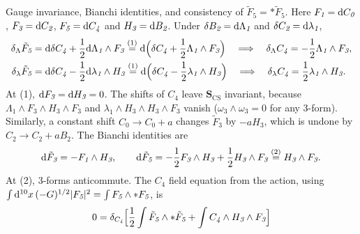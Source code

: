 \begin{tcolorbox}[breakable]
	\begin{remark}
		Gauge invariance, Bianchi identities, and consistency of $\tilde F_{\textit{5}}=\ast\tilde F_{\textit{5}}$. Here $F_{\textit{1}}=\mathrm{d} C_{\textit{0}}$, $F_{\textit{3}}=\mathrm{d} C_{\textit{2}}$, $F_{\textit{5}}=\mathrm{d} C_{\textit{4}}$ and $H_{\textit{3}}=\mathrm{d} B_{\textit{2}}$. Under $\delta B_{\textit{2}}=\mathrm{d}\Lambda_{\textit{1}}$ and $\delta C_{\textit{2}}=\mathrm{d}\lambda_{\textit{1}}$,
		\begin{align*}
			\delta_{\Lambda}\tilde F_{\textit{5}}&=\mathrm{d}\delta C_{\textit{4}}+\frac12\mathrm{d}\Lambda_{\textit{1}}\wedge F_{\textit{3}}
			\overset{(1)}{=} \mathrm{d}\Bigl(\delta C_{\textit{4}}+\frac12\Lambda_{\textit{1}}\wedge F_{\textit{3}}\Bigr)
			\quad\Longrightarrow\quad \delta_{\Lambda}C_{\textit{4}}=-\frac12\Lambda_{\textit{1}}\wedge F_{\textit{3}},\\
			\delta_{\lambda}\tilde F_{\textit{5}}&=\mathrm{d}\delta C_{\textit{4}}-\frac12\mathrm{d}\lambda_{\textit{1}}\wedge H_{\textit{3}}
			\overset{(1)}{=} \mathrm{d}\Bigl(\delta C_{\textit{4}}-\frac12\lambda_{\textit{1}}\wedge H_{\textit{3}}\Bigr)
			\quad\Longrightarrow\quad \delta_{\lambda}C_{\textit{4}}=\frac12\lambda_{\textit{1}}\wedge H_{\textit{3}} .
		\end{align*}
		At (1), $\mathrm{d} F_{\textit{3}}=\mathrm{d} H_{\textit{3}}=0$. The shifts of $C_{\textit{4}}$ leave $\bm S_{\text{CS}}$ invariant, because $\Lambda_{\textit{1}}\wedge F_{\textit{3}}\wedge H_{\textit{3}}\wedge F_{\textit{3}}$ and $\lambda_{\textit{1}}\wedge H_{\textit{3}}\wedge H_{\textit{3}}\wedge F_{\textit{3}}$ vanish ($\omega_{3}\wedge\omega_{3}=0$ for any 3-form). Similarly, a constant shift $C_{\textit{0}}\to C_{\textit{0}}+a$ changes $\tilde F_{\textit{3}}$ by $-aH_{\textit{3}}$, which is undone by $C_{\textit{2}}\to C_{\textit{2}}+aB_{\textit{2}}$. The Bianchi identities are
		\begin{align*}
			\mathrm{d}\tilde F_{\textit{3}}=-F_{\textit{1}}\wedge H_{\textit{3}},\qquad
			\mathrm{d}\tilde F_{\textit{5}}=-\frac12F_{\textit{3}}\wedge H_{\textit{3}}+\frac12H_{\textit{3}}\wedge F_{\textit{3}}\overset{(2)}{=} H_{\textit{3}}\wedge F_{\textit{3}} .
		\end{align*}
		At (2), 3-forms anticommute. The $C_{\textit{4}}$ field equation from the action, using $\int\mathrm{d}^{10}x\,(-G)^{1/2}\lvert F_{\textit{5}}\rvert^{2}=\int F_{\textit{5}}\wedge\ast F_{\textit{5}}$, is
		\begin{align*}
			0=\delta_{C_{\textit{4}}}\Bigl[\frac12\int\tilde F_{\textit{5}}\wedge\ast\tilde F_{\textit{5}}+\int C_{\textit{4}}\wedge H_{\textit{3}}\wedge F_{\textit{3}}\Bigr]

\end{align*}
\end{remark}
\end{tcolorbox}
